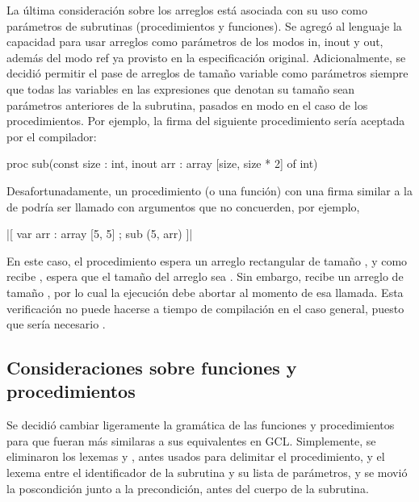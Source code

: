 La última consideración sobre los arreglos está asociada con su uso como
parámetros de subrutinas (procedimientos y funciones). Se agregó al lenguaje la
capacidad para usar arreglos como parámetros de los modos in, inout y out,
además del modo ref ya provisto en la especificación original. Adicionalmente,
se decidió permitir el pase de arreglos de tamaño variable como parámetros
siempre que todas las variables en las expresiones que denotan su tamaño sean
parámetros anteriores de la subrutina, pasados en modo  en el caso
de los procedimientos. Por ejemplo, la firma del siguiente procedimiento sería
aceptada por el compilador:

\begin{gracielacode}
proc sub(const size : int, inout arr : array [size, size * 2] of int)
\end{gracielacode}

Desafortunadamente, un procedimiento (o una función) con una firma similar a la
de  podría ser llamado con argumentos que no concuerden, por
ejemplo,

\begin{gracielacode}
|[ var arr : array [5, 5]
;  sub (5, arr)
]|
\end{gracielacode}

En este caso, el procedimiento  espera un arreglo rectangular de
tamaño , y como recibe , espera que
el tamaño del arreglo sea \ingra{[5, 10]}. Sin embargo, recibe un arreglo de
tamaño \ingra{[5, 5]}, por lo cual la ejecución debe abortar al momento de esa
llamada. Esta verificación no puede hacerse a tiempo de compilación en el caso
general, puesto que sería necesario .

\subsection{Consideraciones sobre funciones y procedimientos}

Se decidió cambiar ligeramente la gramática de las funciones y procedimientos
para que fueran más similaras a sus equivalentes en GCL. Simplemente, se
eliminaron los lexemas  y , antes usados para
delimitar el procedimiento, y el lexema \ingra{:} entre el identificador de la
subrutina y su lista de parámetros, y se movió la poscondición junto a la
precondición, antes del cuerpo de la subrutina.

